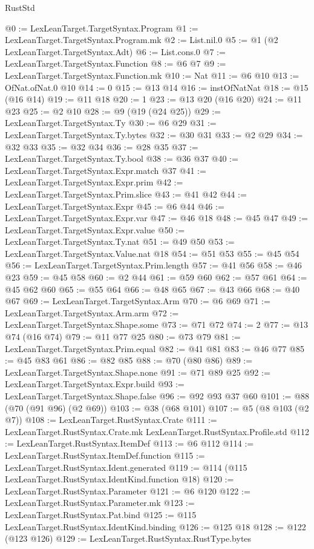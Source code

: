 \begin{lexlean}{RustStd}
\begin{coremodule}
@0 := LexLeanTarget.TargetSyntax.Program
@1 := LexLeanTarget.TargetSyntax.Program.mk
@2 := List.nil.{0}
@5 := @1 (@2 LexLeanTarget.TargetSyntax.Adt)
@6 := List.cons.{0}
@7 := LexLeanTarget.TargetSyntax.Function
@8 := @6 @7
@9 := LexLeanTarget.TargetSyntax.Function.mk
@10 := Nat
@11 := @6 @10
@13 := OfNat.ofNat.{0} @10
@14 := 0
@15 := @13 @14
@16 := instOfNatNat
@18 := @15 (@16 @14)
@19 := @11 @18
@20 := 1
@23 := @13 @20 (@16 @20)
@24 := @11 @23
@25 := @2 @10
@28 := @9 (@19 (@24 @25))
@29 := LexLeanTarget.TargetSyntax.Ty
@30 := @6 @29
@31 := LexLeanTarget.TargetSyntax.Ty.bytes
@32 := @30 @31
@33 := @2 @29
@34 := @32 @33
@35 := @32 @34
@36 := @28 @35
@37 := LexLeanTarget.TargetSyntax.Ty.bool
@38 := @36 @37
@40 := LexLeanTarget.TargetSyntax.Expr.match @37
@41 := LexLeanTarget.TargetSyntax.Expr.prim
@42 := LexLeanTarget.TargetSyntax.Prim.slice
@43 := @41 @42
@44 := LexLeanTarget.TargetSyntax.Expr
@45 := @6 @44
@46 := LexLeanTarget.TargetSyntax.Expr.var
@47 := @46 @18
@48 := @45 @47
@49 := LexLeanTarget.TargetSyntax.Expr.value
@50 := LexLeanTarget.TargetSyntax.Ty.nat
@51 := @49 @50
@53 := LexLeanTarget.TargetSyntax.Value.nat @18
@54 := @51 @53
@55 := @45 @54
@56 := LexLeanTarget.TargetSyntax.Prim.length
@57 := @41 @56
@58 := @46 @23
@59 := @45 @58
@60 := @2 @44
@61 := @59 @60
@62 := @57 @61
@64 := @45 @62 @60
@65 := @55 @64
@66 := @48 @65
@67 := @43 @66
@68 := @40 @67
@69 := LexLeanTarget.TargetSyntax.Arm
@70 := @6 @69
@71 := LexLeanTarget.TargetSyntax.Arm.arm
@72 := LexLeanTarget.TargetSyntax.Shape.some
@73 := @71 @72
@74 := 2
@77 := @13 @74 (@16 @74)
@79 := @11 @77 @25
@80 := @73 @79
@81 := LexLeanTarget.TargetSyntax.Prim.equal
@82 := @41 @81
@83 := @46 @77
@85 := @45 @83 @61
@86 := @82 @85
@88 := @70 (@80 @86)
@89 := LexLeanTarget.TargetSyntax.Shape.none
@91 := @71 @89 @25
@92 := LexLeanTarget.TargetSyntax.Expr.build
@93 := LexLeanTarget.TargetSyntax.Shape.false
@96 := @92 @93 @37 @60
@101 := @88 (@70 (@91 @96) (@2 @69))
@103 := @38 (@68 @101)
@107 := @5 (@8 @103 (@2 @7))
@108 := LexLeanTarget.RustSyntax.Crate
@111 := LexLeanTarget.RustSyntax.Crate.mk LexLeanTarget.RustSyntax.Profile.std
@112 := LexLeanTarget.RustSyntax.ItemDef
@113 := @6 @112
@114 := LexLeanTarget.RustSyntax.ItemDef.function
@115 := LexLeanTarget.RustSyntax.Ident.generated
@119 := @114 (@115 LexLeanTarget.RustSyntax.IdentKind.function @18)
@120 := LexLeanTarget.RustSyntax.Parameter
@121 := @6 @120
@122 := LexLeanTarget.RustSyntax.Parameter.mk
@123 := LexLeanTarget.RustSyntax.Pat.bind
@125 := @115 LexLeanTarget.RustSyntax.IdentKind.binding
@126 := @125 @18
@128 := @122 (@123 @126)
@129 := LexLeanTarget.RustSyntax.RustType.bytes

\end{coremodule}
\end{lexlean}
